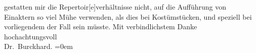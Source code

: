 \begin{ledgroupsized}[t]{13cm}
                    gestatten mir die Repertoir{[}e{]}verhältnisse nicht, auf die
                    Aufführung von Einaktern so viel Mühe \label{T_L00024_1v}\label{T_L00024_1h} verwenden, als dies bei Kostümstücken, und
                    speziell bei vorliegendem der Fall sein müsste.\pend
           \pstart
           Mit verbindlichstem Danke{\\[\baselineskip]}hochachtungsvoll{\\[\baselineskip]}\spacefill\mbox{Dr. Burckhard.}\pend
           \leftskip=0em{}\endnumbering{}\end{ledgroupsized}  \newcommand{\dateiname}{L00024}\newcommand{\titel}{Max Burckhard an Arthur Schnitzler, 14. 7. 1891}\newcommand{\editorInnen}{Martin Anton Müller und Gerd-Hermann Susen}
      